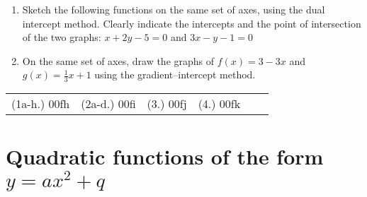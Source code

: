 \begin{exercises}{}
{\begin{enumerate}[noitemsep, label=\textbf{\arabic*}. ]
\begin{figure}[H]
\end{figure}  


\item Sketch the following functions on the same set of axes, using the dual intercept method. Clearly indicate the intercepts and the point of intersection of the two graphs: $x+2y-5=0$ and $3x-y-1=0$
\item On the same set of axes, draw the graphs of $f(x)=3-3x$ and $g(x)=\frac{1}{3}x+1$ using the gradient--intercept method.
\end{enumerate}
\practiceinfo
\par 
\par \begin{tabular}[h]{cccccc}
(1a-h.) 00fh&  (2a-d.) 00fi&  (3.) 00fj& (4.) 00fk\end{tabular}
}
\end{exercises}
   


\section{Quadratic functions of the form $y=a{x}^{2}+q$}

